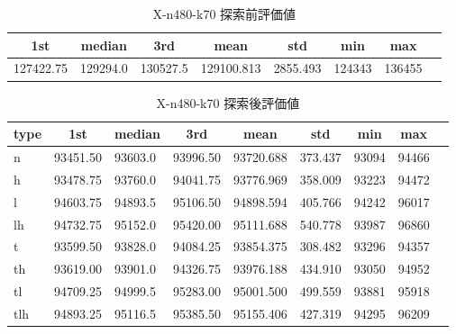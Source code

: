 \begin{table}[htbp]
    \centering
    \caption{X-n480-k70 探索前評価値}
    \begin{tabular}{|l|l|l|l|l|l|l|l|}\hline
    \multicolumn{1}{|c|}{\textbf{1st}}
    &\multicolumn{1}{c|}{\textbf{median}}
    &\multicolumn{1}{c|}{\textbf{3rd}}
    &\multicolumn{1}{c|}{\textbf{mean}}
    &\multicolumn{1}{c|}{\textbf{std}}
    &\multicolumn{1}{c|}{\textbf{min}}
    &\multicolumn{1}{c|}{\textbf{max}}\\\hline
	127422.75 & 129294.0 & 130527.5 & 129100.813 & 2855.493 & 124343 & 136455\\\hline
	\end{tabular}
\end{table}
\begin{table}[htbp]
    \centering
    \caption{X-n480-k70 探索後評価値}
    \begin{tabular}{|l|l|l|l|l|l|l|l|l|}\hline
    \multicolumn{1}{|c|}{\textbf{type}}
    &\multicolumn{1}{|c|}{\textbf{1st}}
    &\multicolumn{1}{c|}{\textbf{median}}
    &\multicolumn{1}{c|}{\textbf{3rd}}
    &\multicolumn{1}{c|}{\textbf{mean}}
    &\multicolumn{1}{c|}{\textbf{std}}
    &\multicolumn{1}{c|}{\textbf{min}}
    &\multicolumn{1}{c|}{\textbf{max}}\\\hline
	n & 93451.50 & 93603.0 & 93996.50 & 93720.688 & 373.437 & 93094 & 94466\\\hline
	h & 93478.75 & 93760.0 & 94041.75 & 93776.969 & 358.009 & 93223 & 94472\\\hline
	l & 94603.75 & 94893.5 & 95106.50 & 94898.594 & 405.766 & 94242 & 96017\\\hline
	lh & 94732.75 & 95152.0 & 95420.00 & 95111.688 & 540.778 & 93987 & 96860\\\hline
	t & 93599.50 & 93828.0 & 94084.25 & 93854.375 & 308.482 & 93296 & 94357\\\hline
	th & 93619.00 & 93901.0 & 94326.75 & 93976.188 & 434.910 & 93050 & 94952\\\hline
	tl & 94709.25 & 94999.5 & 95283.00 & 95001.500 & 499.559 & 93881 & 95918\\\hline
	tlh & 94893.25 & 95116.5 & 95385.50 & 95155.406 & 427.319 & 94295 & 96209\\\hline
	\end{tabular}
\end{table}
